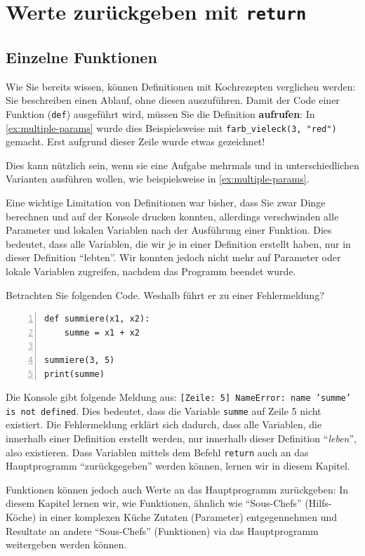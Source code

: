 \section{Werte zurückgeben mit \texorpdfstring{\lstinline|return|}{return}}
\subsection{Einzelne Funktionen}
Wie Sie bereits wissen, können Definitionen mit Kochrezepten verglichen werden: Sie beschreiben einen Ablauf, ohne diesen auszuführen. Damit der Code einer Funktion (\lstinline|def|) ausgeführt wird, müssen Sie die Definition \textbf{aufrufen}: In \cref{ex:multiple-params} wurde dies Beispielsweise mit \lstinline|farb_vieleck(3, "red")| gemacht. Erst aufgrund dieser Zeile wurde etwas gezeichnet!

Dies kann nützlich sein, wenn sie eine Aufgabe mehrmals und in unterschiedlichen Varianten ausführen wollen, wie beispielsweise in \cref{ex:multiple-params}.

Eine wichtige Limitation von Definitionen war bisher, dass Sie zwar Dinge berechnen und auf der Konsole drucken konnten, allerdings verschwinden alle Parameter und lokalen Variablen nach der Ausführung einer Funktion.  Dies bedeutet, dass alle Variablen, die wir je in einer Definition erstellt haben, nur in dieser Definition ``lebten''. Wir konnten jedoch nicht mehr auf Parameter oder lokale Variablen zugreifen, nachdem das Programm beendet wurde.

\begin{myexample}\label{ex:sum-noreturn}
Betrachten Sie folgenden Code. Weshalb führt er zu einer Fehlermeldung?
\begin{lstlisting}[numbers=left]
def summiere(x1, x2):
    summe = x1 + x2
    
summiere(3, 5)
print(summe)
\end{lstlisting}
Die Konsole gibt folgende Meldung aus: \texttt{[Zeile: 5] NameError: name 'summe' is not defined}. Dies bedeutet, dass die Variable \lstinline|summe| auf Zeile 5 nicht existiert. Die Fehlermeldung erklärt sich dadurch, dass alle Variablen, die innerhalb einer Definition erstellt werden, nur innerhalb dieser Definition \enquote{\textit{leben}}, also existieren. Dass Variablen mittels dem Befehl \lstinline|return| auch an das Hauptprogramm ``zurückgegeben'' werden können, lernen wir in diesem Kapitel.
\end{myexample}


Funktionen können jedoch auch Werte an das Hauptprogramm zurückgeben: In diesem Kapitel lernen wir, wie Funktionen, ähnlich wie ``Sous-Chefs'' (Hilfs-Köche) in einer komplexen Küche Zutaten (Parameter) entgegennehmen und Resultate an andere ``Sous-Chefs'' (Funktionen) via das Hauptprogramm weitergeben werden können.

